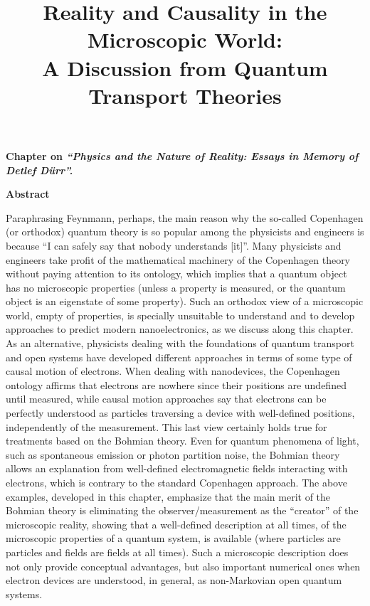 \documentclass[11pt, a4paper]{article} %
\title{\vspace{-2cm} {\bf Reality and Causality in the Microscopic World:\\ A Discussion from Quantum Transport Theories}%
\vspace{-0.4cm}}
\date{\vspace{-11ex}}
\begin{document}



\maketitle



{\bf Chapter on {\em “Physics and the Nature of Reality: Essays in Memory of Detlef Dürr”.}}

\begin{center}
{\bf Abstract }
\end{center}
Paraphrasing Feynmann, perhaps, the main reason why the so-called Copenhagen (or orthodox) quantum theory is so popular among the physicists and engineers is because “I can safely say that nobody understands [it]”. Many physicists and engineers take profit of the mathematical machinery of the Copenhagen theory without paying attention to its ontology, which implies that a quantum object has no microscopic properties (unless a property is measured, or the quantum object is an eigenstate of some property). Such an orthodox view of a microscopic world, empty of properties, is specially unsuitable to understand and to develop approaches to predict modern nanoelectronics, as we discuss along this chapter. As an alternative, physicists dealing with the foundations of quantum transport and open systems have developed different approaches in terms of some type of causal motion of electrons. When dealing with nanodevices, the Copenhagen ontology affirms that electrons are nowhere since their positions are undefined until measured, while causal motion approaches say that electrons can be perfectly understood as particles traversing a device with well-defined positions, independently of the measurement. This last view certainly holds true for treatments based on the Bohmian theory. Even for quantum phenomena of light, such as spontaneous emission or photon partition noise, the Bohmian theory allows an explanation from well-defined electromagnetic fields interacting with electrons, which is contrary to the standard Copenhagen approach. The above examples, developed in this chapter, emphasize that the main merit of the Bohmian theory is eliminating the observer/measurement as the “creator” of the microscopic reality, showing that a well-defined description at all times, of the microscopic properties of a quantum system, is available (where particles are particles and fields are fields at all times). Such a microscopic description does not only provide conceptual advantages, but also important numerical ones when electron devices are understood, in general, as non-Markovian open quantum systems.   
\end{document}
